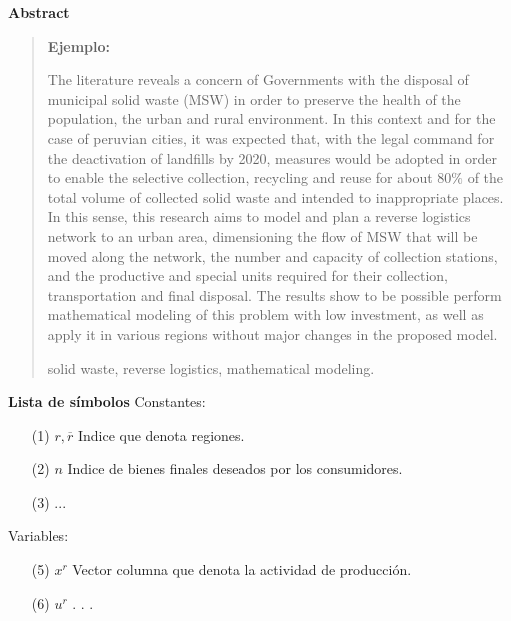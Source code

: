 \newpage
\begin{center}
 {\bf\LARGE Abstract}\vskip 1.5cm
\end{center} 
\begin{quotation}

{\bf Ejemplo:}\par

The literature reveals a concern of Governments with the disposal of municipal solid waste (MSW) in order to preserve the health of the population, the urban and rural environment. In this context and for the case of peruvian cities, it was expected that, with the legal command for the deactivation of landfills by 2020, measures would be adopted in order to enable the selective collection, recycling and reuse for about $80\%$ of the total volume of collected solid waste and intended to inappropriate places. 
\vskip 0.2cm
In this sense, this research aims to model and plan a reverse logistics network to an urban area, dimensioning the flow of MSW that will be moved along the network, the number and capacity of collection stations, and the productive and special units required for their collection, transportation and final disposal. The results show to be possible perform mathematical modeling of this problem with low investment, as well as apply it in various regions without major changes in the proposed model.

\vskip 0.3cm
\hspace*{-0.6cm}{\bf Keywords:} solid waste, reverse logistics, mathematical modeling.
\end{quotation}


\newpage
{}
 {\bf\LARGE Lista de símbolos}
 \vskip 1.5cm
Constantes: 
\begin{enumerate}
\item[(1)]$r,\overline{r} $ \hspace*{0.8cm} Indice que denota regiones.
\item[(2)] $n $ \hspace*{1.1cm} Indice de bienes finales deseados por los consumidores.
\item[(3)] ...
\vskip 3cm
\end{enumerate} 
\vskip 0.3cm
Variables:
\begin{enumerate}
\item[(5)] $ x^{r} $ \hspace*{1cm} Vector columna que denota la actividad de producción.
\item[(6)] $ u^{r} $ \hspace*{1.2cm} . . .
\end{enumerate}

